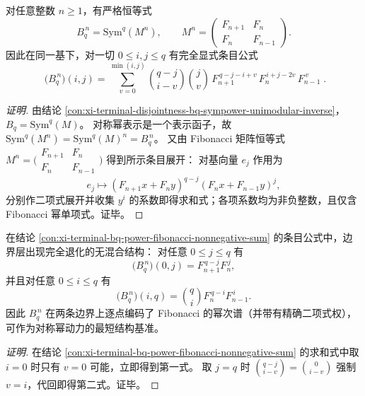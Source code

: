 \begin{conclusion}\label{con:xi-terminal-bq-power-fibonacci-nonnegative-sum}
对任意整数 \(n\ge 1\)，有严格恒等式
\[
B_q^{\,n}=\mathrm{Sym}^q(M^n),
\qquad
M^n=\begin{pmatrix}F_{n+1}&F_n\\[2pt]F_n&F_{n-1}\end{pmatrix}.
\]
因此在同一基下，对一切 \(0\le i,j\le q\) 有完全显式条目公式
\[
\boxed{\;
\bigl(B_q^{\,n}\bigr)(i,j)
=\sum_{v=0}^{\min(i,j)}
\binom{q-j}{i-v}\binom{j}{v}\,
F_{n+1}^{\,q-j-i+v}\,
F_{n}^{\,i+j-2v}\,
F_{n-1}^{\,v}\; }.
\]
\end{conclusion}
\begin{proof}[证明]
由结论 \ref{con:xi-terminal-disjointness-bq-sympower-unimodular-inverse}，\(B_q=\mathrm{Sym}^q(M)\)。
对称幂表示是一个表示函子，故 \(\mathrm{Sym}^q(M^n)=\mathrm{Sym}^q(M)^n=B_q^{\,n}\)。
又由 Fibonacci 矩阵恒等式 \(M^n=\bigl(\begin{smallmatrix}F_{n+1}&F_n\\ F_n&F_{n-1}\end{smallmatrix}\bigr)\) 得到所示条目展开：
对基向量 \(e_j\) 作用为
\[
e_j\longmapsto (F_{n+1}x+F_ny)^{q-j}(F_nx+F_{n-1}y)^j,
\]
分别作二项式展开并收集 \(y^i\) 的系数即得求和式；各项系数均为非负整数，且仅含 Fibonacci 幂单项式。证毕。
\end{proof}

\begin{conclusion}\label{con:xi-terminal-bq-boundary-nonmixing-law}
在结论 \ref{con:xi-terminal-bq-power-fibonacci-nonnegative-sum} 的条目公式中，边界层出现完全退化的无混合结构：
对任意 \(0\le j\le q\) 有
\[
\bigl(B_q^{\,n}\bigr)(0,j)=F_{n+1}^{\,q-j}F_n^{\,j},
\]
并且对任意 \(0\le i\le q\) 有
\[
\bigl(B_q^{\,n}\bigr)(i,q)=\binom{q}{i}F_n^{\,q-i}F_{n-1}^{\,i}.
\]
因此 \(B_q^{\,n}\) 在两条边界上逐点编码了 Fibonacci 的幂次谱（并带有精确二项式权），可作为对称幂动力的最短结构基准。
\end{conclusion}
\begin{proof}[证明]
在结论 \ref{con:xi-terminal-bq-power-fibonacci-nonnegative-sum} 的求和式中取 \(i=0\) 时只有 \(v=0\) 可能，立即得到第一式。
取 \(j=q\) 时 \(\binom{q-j}{i-v}=\binom{0}{i-v}\) 强制 \(v=i\)，代回即得第二式。证毕。
\end{proof}
